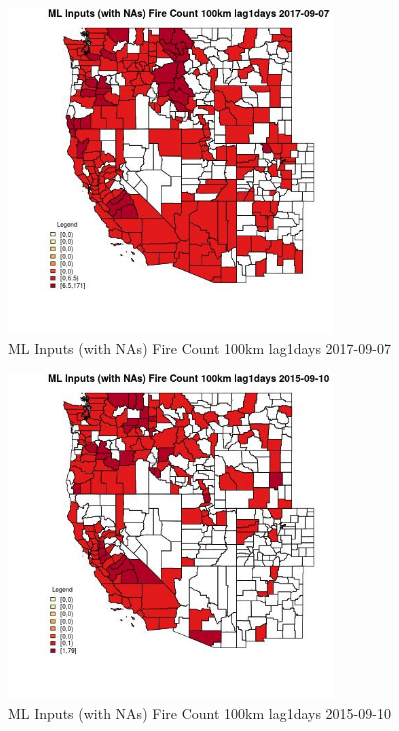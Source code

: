 \begin{figure} 
\centering  
\includegraphics[width=0.77\textwidth]{Code_Outputs/Report_ML_input_PM25_Step4_part_e_de_duplicated_aves_compiled_2019-05-20wNAs_CountyFire_Count_100km_lag1daysMean2017-09-07.jpg} 
\caption{\label{fig:Report_ML_input_PM25_Step4_part_e_de_duplicated_aves_compiled_2019-05-20wNAsCountyFire_Count_100km_lag1daysMean2017-09-07}ML Inputs (with NAs) Fire Count 100km lag1days 2017-09-07} 
\end{figure} 
 

\begin{figure} 
\centering  
\includegraphics[width=0.77\textwidth]{Code_Outputs/Report_ML_input_PM25_Step4_part_e_de_duplicated_aves_compiled_2019-05-20wNAs_CountyFire_Count_100km_lag1daysMean2015-09-10.jpg} 
\caption{\label{fig:Report_ML_input_PM25_Step4_part_e_de_duplicated_aves_compiled_2019-05-20wNAsCountyFire_Count_100km_lag1daysMean2015-09-10}ML Inputs (with NAs) Fire Count 100km lag1days 2015-09-10} 
\end{figure} 
 

